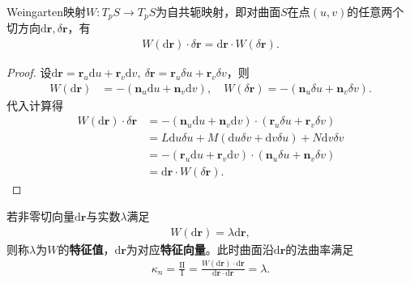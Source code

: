 \documentclass[../../main.tex]{subfiles}%
\begin{document}
\begin{theorem}
Weingarten映射$W:T_pS\to T_pS$为自共轭映射，即对曲面$S$在点$(u,v)$的任意两个切方向$\mathrm{d}\boldsymbol{r},\delta\boldsymbol{r}$，有
\begin{align}
W(\mathrm{d}\boldsymbol{r})\cdot\delta\boldsymbol{r}=\mathrm{d}\boldsymbol{r}\cdot W(\delta\boldsymbol{r}).\label{eq:self_conjugate}
\end{align}
\end{theorem}
\begin{proof}
设$\mathrm{d}\boldsymbol{r}=\boldsymbol{r}_u\mathrm{d}u+\boldsymbol{r}_v\mathrm{d}v,\ \delta\boldsymbol{r}=\boldsymbol{r}_u\delta u+\boldsymbol{r}_v\delta v$，则
\begin{align*}
W(\mathrm{d}\boldsymbol{r})&=-(\boldsymbol{n}_u\mathrm{d}u+\boldsymbol{n}_v\mathrm{d}v),\quad W(\delta\boldsymbol{r})=-(\boldsymbol{n}_u\delta u+\boldsymbol{n}_v\delta v).
\end{align*}
代入计算得
\begin{align*}
W(\mathrm{d}\boldsymbol{r})\cdot\delta\boldsymbol{r}&=-(\boldsymbol{n}_u\mathrm{d}u+\boldsymbol{n}_v\mathrm{d}v)\cdot(\boldsymbol{r}_u\delta u+\boldsymbol{r}_v\delta v)\\
&=L\mathrm{d}u\delta u+M(\mathrm{d}u\delta v+\mathrm{d}v\delta u)+N\mathrm{d}v\delta v\\
&=-(\boldsymbol{r}_u\mathrm{d}u+\boldsymbol{r}_v\mathrm{d}v)\cdot(\boldsymbol{n}_u\delta u+\boldsymbol{n}_v\delta v)\\
&=\mathrm{d}\boldsymbol{r}\cdot W(\delta\boldsymbol{r}).
\end{align*}
\end{proof}

\begin{definition}
若非零切向量$\mathrm{d}\boldsymbol{r}$与实数$\lambda$满足
\begin{align}
W(\mathrm{d}\boldsymbol{r})=\lambda\mathrm{d}\boldsymbol{r},\label{eq:eigen_weingarten}
\end{align}
则称$\lambda$为$W$的\textbf{特征值}，$\mathrm{d}\boldsymbol{r}$为对应\textbf{特征向量}。此时曲面沿$\mathrm{d}\boldsymbol{r}$的法曲率满足
\begin{align}
\kappa_n=\frac{\mathrm{II}}{\mathrm{I}}=\frac{W(\mathrm{d}\boldsymbol{r})\cdot\mathrm{d}\boldsymbol{r}}{\mathrm{d}\boldsymbol{r}\cdot\mathrm{d}\boldsymbol{r}}=\lambda.\label{eq:kn_eigenvalue}
\end{align}
\end{definition}
\end{document}
